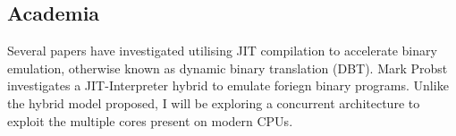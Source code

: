 \subsection{Academia}

Several papers have investigated utilising JIT compilation to accelerate binary emulation, otherwise known as dynamic binary translation (DBT). Mark Probst \cite{mark-probst-dbt} investigates a JIT-Interpreter hybrid to emulate foriegn binary programs. Unlike the hybrid model proposed, I will be exploring a concurrent architecture to exploit the multiple cores present on modern CPUs.